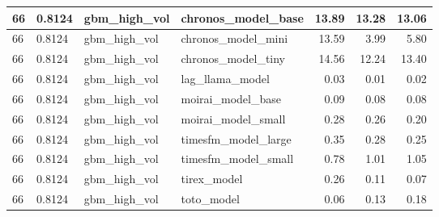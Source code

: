 {\begin{tabular}{llllrrr}
66 & 0.8124 & gbm\_high\_vol & chronos\_model\_base & 13.89 & 13.28 & 13.06 \\
\midrule
66 & 0.8124 & gbm\_high\_vol & chronos\_model\_mini & 13.59 & 3.99 & 5.80 \\
\midrule
66 & 0.8124 & gbm\_high\_vol & chronos\_model\_tiny & 14.56 & 12.24 & 13.40 \\
\midrule
66 & 0.8124 & gbm\_high\_vol & lag\_llama\_model & 0.03 & 0.01 & 0.02 \\
\midrule
66 & 0.8124 & gbm\_high\_vol & moirai\_model\_base & 0.09 & 0.08 & 0.08 \\
\midrule
66 & 0.8124 & gbm\_high\_vol & moirai\_model\_small & 0.28 & 0.26 & 0.20 \\
\midrule
66 & 0.8124 & gbm\_high\_vol & timesfm\_model\_large & 0.35 & 0.28 & 0.25 \\
\midrule
66 & 0.8124 & gbm\_high\_vol & timesfm\_model\_small & 0.78 & 1.01 & 1.05 \\
\midrule
66 & 0.8124 & gbm\_high\_vol & tirex\_model & 0.26 & 0.11 & 0.07 \\
\midrule
66 & 0.8124 & gbm\_high\_vol & toto\_model & 0.06 & 0.13 & 0.18 \\
\bottomrule
\end{tabular}
}